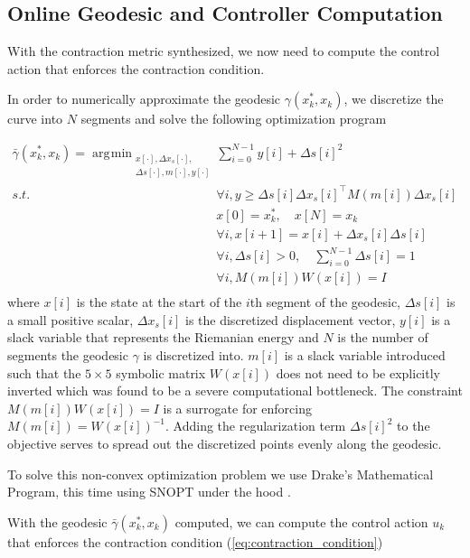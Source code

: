\documentclass[journal]{IEEEtran}
\DeclareMathOperator*{\argmin}{\arg\!\min}
\begin{document}
\subsection{Online Geodesic and Controller Computation}
With the contraction metric synthesized, we now need to compute the control action that enforces the contraction condition.

In order to numerically approximate the geodesic $\gamma(x^*_k, x_k)$, we discretize the curve into $N$ segments and solve the following optimization program

\begin{equation}
	\label{eq:geodesic_opt}
	\begin{aligned}
		\bar{\gamma}(x^*_k, x_k) =
		\argmin_{ \substack{ x[\cdot], \Delta x_{s}[\cdot],\\ \Delta s[\cdot], m[\cdot], y[\cdot]}}
		 & \sum_{i=0}^{N-1} y[i] + \Delta s[i]^2 \\
		s.t. \quad & \forall i, y \geq \Delta s[i] \Delta x_s[i]^\top M(m[i]) \Delta x_s[i]\\
		& x[0] = x^*_k, \quad x[N] = x_k \\
		& \forall i, x[i+1] = x[i] + \Delta x_{s}[i]\Delta s[i] \\
		& \forall i, \Delta s[i] > 0, \quad \sum_{i=0}^{N-1} \Delta s[i] = 1\\
		& \forall i, M(m[i]) W(x[i]) = I  \\
	\end{aligned}
\end{equation}
where $x[i]$ is the state at the start of the $i$th segment of the geodesic, $\Delta s[i]$ is a small positive scalar, $\Delta x_s[i]$ is the discretized displacement vector, $y[i]$ is a slack variable that represents the Riemanian energy and $N$ is the number of segments the geodesic $\gamma$ is discretized into. $m[i]$ is a slack variable introduced such that the $5\times5$ symbolic matrix $W(x[i])$ does not need to be explicitly inverted which was found to be a severe computational bottleneck. The constraint $M(m[i]) W(x[i]) = I$ is a surrogate for enforcing $M(m[i])=W(x[i])^{-1}$. Adding the regularization term $\Delta s[i]^2$ to the objective serves to spread out the discretized points evenly along the geodesic.

To solve this non-convex optimization problem we use Drake's Mathematical Program, this time using SNOPT under the hood \autocite{DrakeModelBasedDesign}.

With the geodesic $\bar{\gamma}(x^*_k, x_k)$ computed, we can compute the control action $u_k$ that enforces the contraction condition (\ref{eq:contraction_condition})
\end{document}
